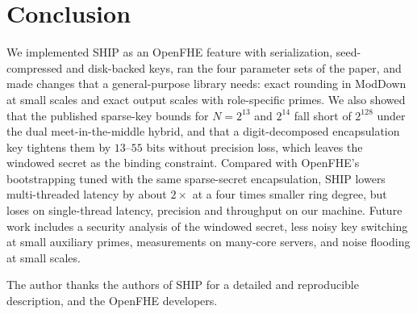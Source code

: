 \documentclass[sigconf,nonacm]{acmart}
\begin{document}
\section{Conclusion}

We implemented SHIP as an OpenFHE feature with serialization, seed-compressed and disk-backed keys, ran the four parameter sets of the paper, and made changes that a general-purpose library needs: exact rounding in ModDown at small scales and exact output scales with role-specific primes. We also showed that the published sparse-key bounds for $N=2^{13}$ and $2^{14}$ fall short of $2^{128}$ under the dual meet-in-the-middle hybrid, and that a digit-decomposed encapsulation key tightens them by $13$--$55$ bits without precision loss, which leaves the windowed secret as the binding constraint.
Compared with OpenFHE's bootstrapping tuned with the same sparse-secret encapsulation, SHIP lowers multi-threaded latency by about $2\times$ at a four times smaller ring degree, but loses on single-thread latency, precision and throughput on our machine.
Future work includes a security analysis of the windowed secret,  less noisy key switching at small auxiliary primes, measurements on many-core servers, and noise flooding at small scales.

\ifdefined\shipanonymous\else
\begin{acks}
The author thanks the authors of SHIP for a detailed and reproducible description, and the OpenFHE developers.
\end{acks}
\fi




\appendix
\end{document}
